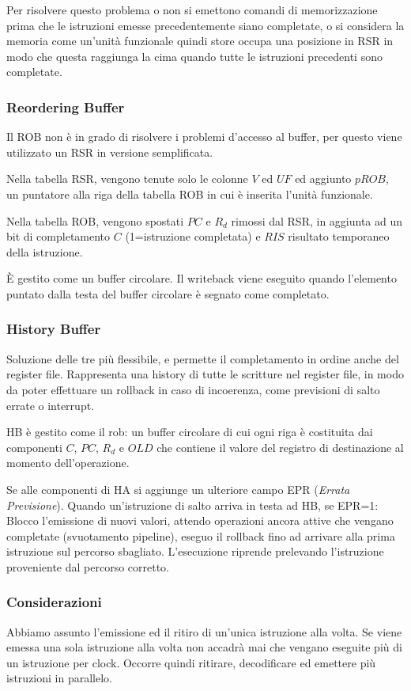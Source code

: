 \documentclass[../template]{subfiles}
\begin{document}
Per risolvere questo problema o non si emettono comandi di memorizzazione prima che le istruzioni emesse precedentemente
siano completate, o si considera la memoria come un'unità funzionale quindi store occupa una posizione in RSR in modo
che questa raggiunga la cima quando tutte le istruzioni precedenti sono completate.

\subsubsection{Reordering Buffer}
Il ROB non è in grado di risolvere i problemi d'accesso al buffer, per questo viene utilizzato un RSR in versione
semplificata.

Nella tabella RSR, vengono tenute solo le colonne $V$ ed $UF$ ed aggiunto $pROB$, un puntatore alla riga
della tabella ROB in cui è inserita l'unità funzionale.

Nella tabella ROB, vengono spostati $PC$ e $R_d$ rimossi dal RSR, in aggiunta ad un bit di completamento $C$
(1=istruzione completata) e $RIS$ risultato temporaneo della istruzione.

È gestito come un buffer circolare. Il writeback viene eseguito quando l'elemento puntato dalla testa del buffer
circolare è segnato come completato.

\subsubsection{History Buffer}
Soluzione delle tre più flessibile, e permette il completamento in ordine anche del register file.
Rappresenta una history di tutte le scritture nel register file, in modo da poter effettuare un rollback in caso di
incoerenza, come previsioni di salto errate o interrupt.

HB è gestito come il rob: un buffer circolare di cui ogni riga è costituita dai componenti $C$, $PC$, $R_d$ e $OLD$ che
contiene il valore del registro di destinazione al momento dell'operazione.

Se alle componenti di HA si aggiunge un ulteriore campo EPR (\textit{Errata Previsione}). Quando un'istruzione di salto
arriva in testa ad HB, se EPR=1: Blocco l'emissione di nuovi valori, attendo operazioni ancora attive che vengano
completate (svuotamento pipeline), eseguo il rollback fino ad arrivare alla prima istruzione sul percorso sbagliato.
L'esecuzione riprende prelevando l'istruzione proveniente dal percorso corretto.


\subsubsection{Considerazioni}
Abbiamo assunto l'emissione ed il ritiro di un'unica istruzione alla volta. Se viene emessa una sola istruzione alla
volta non accadrà mai che vengano eseguite più di un istruzione per clock. Occorre quindi ritirare, decodificare ed emettere più
istruzioni in parallelo.
\end{document}
